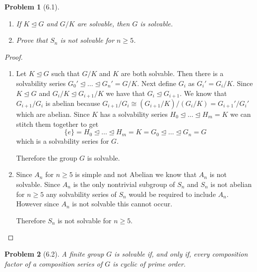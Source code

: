 \documentclass[10pt]{article}
\newcommand{\sk}{\vskip 10mm}
\theoremstyle{plain}
\newtheorem{problem}{Problem}
\theoremstyle{remark}
\begin{document}
\begin{problem}[6.1]
  \begin{enumerate}
  \item If $K\trianglelefteq G$ and $G/K$ are solvable, then $G$ is solvable.
  \item Prove that $S_n$ is not solvable for $n\geq 5$.
  \end{enumerate}
\end{problem}

\begin{proof}
  \begin{enumerate}
  \item Let $K\trianglelefteq G$ such that $G/K$ and $K$ are both solvable.
    Then there is a solvability series
    $G_0'\trianglelefteq\ldots\trianglelefteq G_n' =G/K$.
    Next define $G_i$ as $G_{i}'=G_i/K$. Since $K\trianglelefteq G$ and
    $G_i/K\trianglelefteq G_{i+1}/K$ we have that $G_i\trianglelefteq G_{i+1}$.
    We know that $G_{i+1}/G_i$ is abelian because
    $G_{i+1}/G_i\cong (G_{i+1}/K)/(G_i/K)=G_{i+1}'/G_i'$ which are abelian.
    Since $K$ has a solvability series
    $H_0\trianglelefteq \ldots\trianglelefteq H_m=K$ we can stitch
    them together to get
    \[ \{e\}=H_0\trianglelefteq\ldots\trianglelefteq H_m=K=G_0\trianglelefteq
      \ldots\trianglelefteq G_n=G\]
    which is a solvability series for $G$.

    Therefore the group $G$ is solvable.
  \item Since $A_n$ for $n\geq 5$ is simple and not Abelian we know that
    $A_n$ is not solvable. Since $A_n$ is the only nontrivial subgroup of
    $S_n$ and $S_n$ is not abelian for $n\geq 5$ any solvability series of $S_n$
    would be required to include $A_n$. However since $A_n$ is not solvable
    this cannot occur.

    Therefore $S_n$ is not solvable for $n\geq 5$.
  \end{enumerate}
\end{proof}

\sk

\begin{problem}[6.2]
  A finite group $G$ is solvable if, and only if, every composition factor
  of a composition series of $G$ is cyclic of prime order.
\end{problem}
\end{document}
